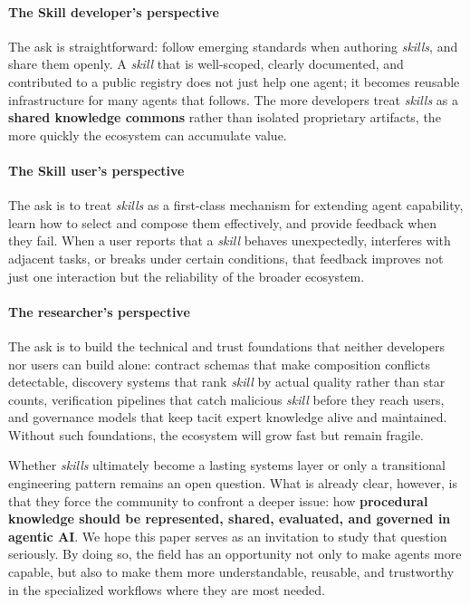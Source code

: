 \documentclass[sigconf,nonacm]{acmart}
\begin{document}
\vspace{-0.05in}
\paragraph{\textbf{The Skill developer's perspective}} The ask is straightforward: follow emerging standards when authoring \emph{skills}, and share them openly. A \emph{skill} that is well-scoped, clearly documented, and contributed to a public registry does not just help one agent;  it becomes reusable infrastructure for many agents that follows. The more developers treat \emph{skills} as a \textbf{shared knowledge commons} rather than isolated proprietary artifacts, the more quickly the ecosystem can accumulate value.

\vspace{-0.05in}
\paragraph{\textbf{The Skill user's perspective}} 
The ask is to treat \emph{skills} as a first-class mechanism for extending agent capability, learn how to select and compose them effectively, and provide feedback when they fail. When a user reports that a \emph{skill} behaves unexpectedly, interferes with adjacent tasks, or breaks under certain conditions, that feedback improves not just one interaction but the reliability of the broader ecosystem.

 
\vspace{-0.05in}
\paragraph{\textbf{The researcher's perspective}} The ask is to build the technical and trust foundations that neither developers nor users can build alone: contract schemas that make composition conflicts detectable, discovery systems that rank \emph{skill}  by actual quality rather than star counts, verification pipelines that catch malicious \emph{skill}  before they reach users, and governance models that keep tacit expert knowledge alive and maintained. Without such foundations, the ecosystem will grow fast but remain fragile.
% 

Whether \emph{skills} ultimately become a lasting systems layer or only a transitional engineering pattern remains an open question. What is already clear, however, is that they force the community to confront a deeper issue: how \textbf{procedural knowledge should be represented, shared, evaluated, and governed in agentic AI}. We hope this paper serves as an invitation to study that question seriously. By doing so, the field has an opportunity not only to make agents more capable, but also to make them more understandable, reusable, and trustworthy in the specialized workflows where they are most needed.
\end{document}
